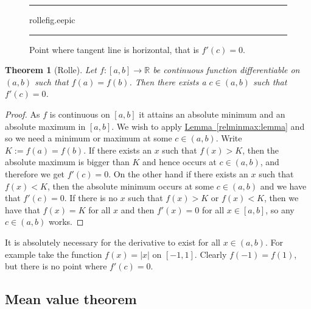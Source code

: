 \documentclass[12pt]{book}
\newenvironment{myfigureht}{%
\begin{figure}[h!t]
\noindent\rule{\textwidth}{0.4pt}\vspace{12pt}\par\centering}%
{\par\noindent\rule{\textwidth}{0.4pt}
\end{figure}}
\newcommand{\abs}[1]{\left\lvert {#1} \right\rvert}
\newcommand{\R}{{\mathbb{R}}}
\theoremstyle{plain}
\newtheorem{thm}{Theorem}[section]
\theoremstyle{remark}
\theoremstyle{definition}
\theoremstyle{exercise}
\theoremstyle{example}
\newcommand{\lemmaref}[1]{\hyperref[#1]{Lemma~\ref*{#1}}}
\begin{document}
\begin{myfigureht}
{rollefig.eepic}
\caption{Point where tangent line is horizontal, that is $f'(c) =
0$.\label{rollefig}}
\end{myfigureht}

\begin{thm}[Rolle] \label{thm:rolle}
Let $f \colon [a,b] \to \R$ be continuous function
differentiable on $(a,b)$ such that $f(a) = f(b)$.
Then there exists a $c \in (a,b)$ such that $f'(c) = 0$.
\end{thm}

\begin{proof}
As $f$ is continuous on $[a,b]$ it attains an absolute minimum and an
absolute 
maximum in $[a,b]$.  We wish to apply \lemmaref{relminmax:lemma} and
so we need a minimum or maximum at some $c \in (a,b)$.
Write $K := f(a) = f(b)$.
If there exists an $x$ such that $f(x) > K$, then the absolute
maximum is bigger than $K$ and hence occurs at $c \in (a,b)$, and
therefore we get $f'(c) = 0$.  On the other hand if there exists an $x$
such that $f(x) < K$, then the absolute minimum occurs at some
$c \in (a,b)$ and we have that $f'(c) = 0$.  If there is no $x$ such that
$f(x) > K$ or
$f(x) < K$, then we have that $f(x) = K$ for all $x$ and then
$f'(x) = 0$ for all $x \in [a,b]$, so any $c \in (a,b)$ works.
\end{proof}

It is absolutely necessary for the derivative to exist for all $x
\in (a,b)$.  For example take the function $f(x) = \abs{x}$ on $[-1,1]$.
Clearly $f(-1) = f(1)$, but there is no point where $f'(c) = 0$.

\subsection{Mean value theorem}
\end{document}

